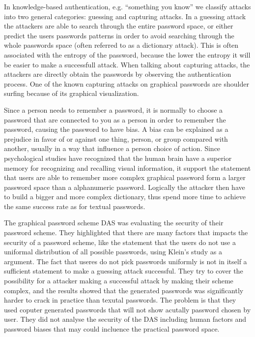   In knowledge-based authentication, e.g. ``something you know'' we classify attacks into two general categories: guessing and capturing attacks. In a guessing attack the attackers are able to search through the entire password space, or either predict the users passwords patterns in order to avoid searching through the whole passwords space (often referred to as a dictionary attack). This is often associated with the entropy of the password, because the lower the entropy it will be easier to make a successfull attack. When talking about capturing attacks, the attackers are directly obtain the passwords by observing the authentication process. One of the known capturing attacks on graphical passwords are shoulder surfing because of its graphical visualization.  

  Since a person needs to remember a password, it is normally to choose a password that are connected to you as a person in order to remember the password, causing the password to have bias. A bias can be explained as a prejudice in favor of or against one thing, person, or group compared with another, usually in a way that influence a person choice of action. Since psychological studies have recognized that the human brain have a superior memory for recognizing and recalling visual information, it support the statement that users are able to remember more complex graphical password form a larger password space than a alphanumeric password. Logically the attacker then have to build a bigger and more complex dictionary, thus spend more time to achieve the same success rate as for textual passwords. %

  The graphical password scheme DAS \cite{Jermyn} was evaluating the security of their password scheme. They highlighted that there are many factors that impacts the security of a password scheme, like the statement that the users do not use a uniformal distribution of all possible passwords, using Klein's study \cite{UnixPasswords} as a argument. The fact that useres do not pick passwords uniformly is not in itself a sufficient statement to make a guessing attack successful. They try to cover the possibility for a attacker making a successful attack by making their scheme complex, and the results showed that the generated passwords was significantly harder to crack in practice than texutal passwords. The problem is that they used coputer generated passwords that will not show acutally password chosen by user. They did not analyse the security of the DAS including human factors and password biases that may could incluence the practical password space. 

